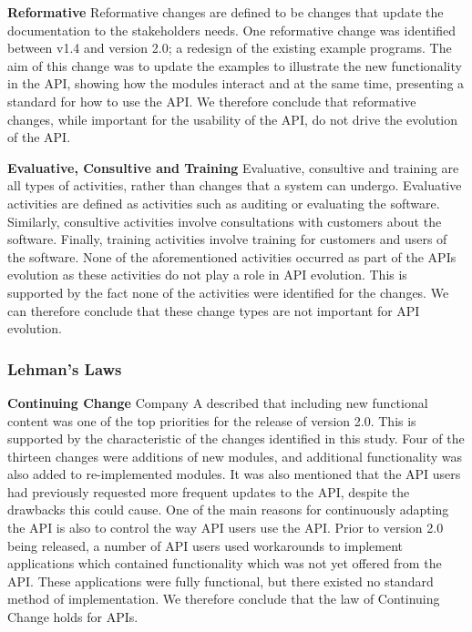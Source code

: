 \documentclass{sig-alternate}
\begin{document}
\smallskip \noindent
\textbf{Reformative  }
Reformative changes are defined to be changes that update the documentation to the stakeholders needs.
One reformative change was identified between v1.4 and version 2.0; a redesign of the existing example programs. The aim of this change was to update the examples to illustrate the new functionality in the API, showing how the modules interact and at the same time, presenting a standard for how to use the API.
We therefore conclude that reformative changes, while important for the usability of the API, do not drive the evolution of the API.

\smallskip \noindent
\textbf{Evaluative, Consultive and Training  }
Evaluative, consultive and training are all types of activities, rather than changes that a system can undergo. Evaluative activities are defined as activities such as auditing or evaluating the software. Similarly, consultive activities involve consultations with customers about the software. Finally, training activities involve training for customers and users of the software.
None of the aforementioned activities occurred as part of the APIs evolution as these activities do not play a role in API evolution. This is supported by the fact none of the activities were identified for the changes.
We can therefore conclude that these change types are not important for API evolution.


\subsubsection{Lehman's Laws} 

\smallskip \noindent
\textbf{Continuing Change  } 
Company A described that including new functional content was one of the top priorities for the release of version 2.0. This is supported by the characteristic of the changes identified in this study. Four of the thirteen changes were additions of new modules, and additional functionality was also added to re-implemented modules. It was also mentioned that the API users had previously requested more frequent updates to the API, despite the drawbacks this could cause. One of the main reasons for continuously adapting the API is also to control the way API users use the API. Prior to version 2.0 being released, a number of API users used workarounds to implement applications which contained functionality which was not yet offered from the API. These applications were fully functional, but there existed no standard method of implementation. We therefore conclude that the law of Continuing Change holds for APIs. 
\end{document}
